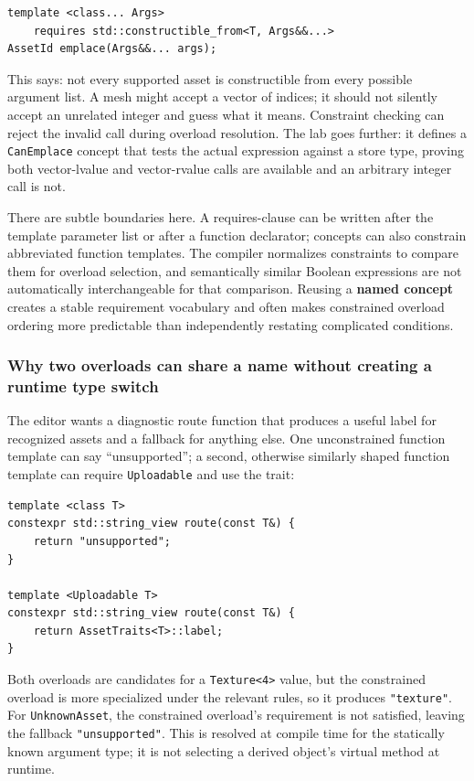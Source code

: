 \begin{verbatim}
template <class... Args>
    requires std::constructible_from<T, Args&&...>
AssetId emplace(Args&&... args);
\end{verbatim}

This says: not every supported asset is constructible from every possible argument list. A mesh might accept a vector of indices; it should not silently accept an unrelated integer and guess what it means. Constraint checking can reject the invalid call during overload resolution. The lab goes further: it defines a \texttt{CanEmplace} concept that tests the actual expression against a store type, proving both vector-lvalue and vector-rvalue calls are available and an arbitrary integer call is not.

There are subtle boundaries here. A requires-clause can be written after the template parameter list or after a function declarator; concepts can also constrain abbreviated function templates. The compiler normalizes constraints to compare them for overload selection, and semantically similar Boolean expressions are not automatically interchangeable for that comparison. Reusing a \textbf{named concept} creates a stable requirement vocabulary and often makes constrained overload ordering more predictable than independently restating complicated conditions.

\subsubsection{Why two overloads can share a name without creating a runtime type switch}\label{why-two-overloads-can-share-a-name-without-creating-a-runtime-type-switch}

The editor wants a diagnostic route function that produces a useful label for recognized assets and a fallback for anything else. One unconstrained function template can say ``unsupported''; a second, otherwise similarly shaped function template can require \texttt{Uploadable} and use the trait:

\begin{verbatim}
template <class T>
constexpr std::string_view route(const T&) {
    return "unsupported";
}

template <Uploadable T>
constexpr std::string_view route(const T&) {
    return AssetTraits<T>::label;
}
\end{verbatim}

Both overloads are candidates for a \texttt{Texture\textless{}4\textgreater{}} value, but the constrained overload is more specialized under the relevant rules, so it produces \texttt{"texture"}. For \texttt{UnknownAsset}, the constrained overload's requirement is not satisfied, leaving the fallback \texttt{"unsupported"}. This is resolved at compile time for the statically known argument type; it is not selecting a derived object's virtual method at runtime.

